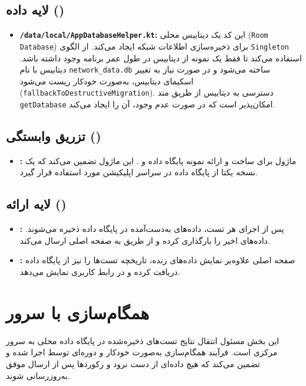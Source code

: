 \subsection{لایه داده ()}
\begin{itemize}
    \item \textbf{\texttt{/data/local/AppDatabaseHelper.kt}:}  
    این کد یک دیتابیس محلی (\texttt{Room Database}) برای ذخیره‌سازی اطلاعات شبکه ایجاد می‌کند.  
    از الگوی \texttt{Singleton} استفاده می‌کند تا فقط یک نمونه از دیتابیس در طول عمر برنامه وجود داشته باشد. 
    دیتابیس با نام \texttt{network\_data.db} ساخته می‌شود و در صورت نیاز به تغییر اسکیمای دیتابیس، به‌صورت خودکار ریست می‌شود (\texttt{fallbackToDestructiveMigration}).  
    دسترسی به دیتابیس از طریق متد \texttt{getDatabase} امکان‌پذیر است که در صورت عدم وجود، آن را ایجاد می‌کند.
    
\end{itemize}

\subsection{تزریق وابستگی ()}
\begin{itemize}
    \item \textbf{:}  
    ماژول  برای ساخت و ارائه نمونه پایگاه داده و . این ماژول تضمین می‌کند که یک نسخه یکتا از پایگاه داده در سراسر اپلیکیشن مورد استفاده قرار گیرد.
\end{itemize}

\subsection{لایه ارائه ()}
\begin{itemize}
    \item \textbf{:}  
    پس از اجرای هر تست، داده‌های به‌دست‌آمده در پایگاه داده ذخیره می‌شوند.  داده‌های اخیر را بارگذاری کرده و از طریق  به صفحه اصلی ارسال می‌کند.
    
    \item \textbf{:}  
    صفحه اصلی علاوه‌بر نمایش داده‌های زنده، تاریخچه تست‌ها را نیز از پایگاه داده دریافت کرده و در رابط کاربری نمایش می‌دهد.
\end{itemize}


\section{همگام‌سازی با سرور}
این بخش مسئول انتقال نتایج تست‌های ذخیره‌شده در پایگاه داده محلی به سرور مرکزی است. فرآیند همگام‌سازی به‌صورت خودکار و دوره‌ای توسط  اجرا شده و تضمین می‌کند که هیچ داده‌ای از دست نرود و رکوردها پس از ارسال موفق به‌روزرسانی شوند.


